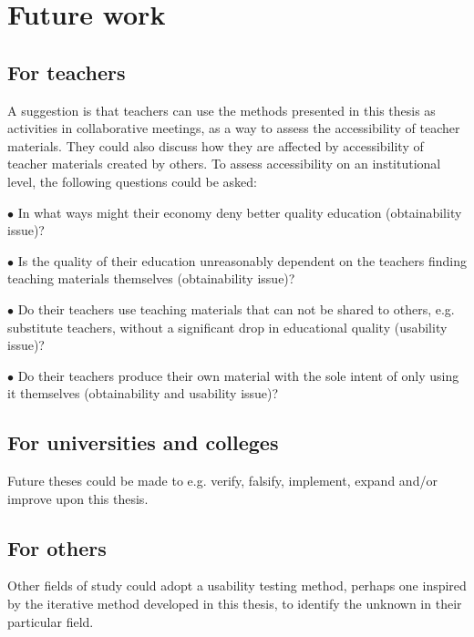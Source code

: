 \section{Future work}	
\subsection{For teachers}
A suggestion is that teachers can use the methods presented in this thesis as activities in collaborative meetings, as a way to assess the accessibility of teacher materials. They could also discuss how they are affected by accessibility of teacher materials created by others. To assess accessibility on an institutional level, the following questions could be asked:
\begin{description}
\item $\bullet$ In what ways might their economy deny better quality education (obtainability issue)? 
\item $\bullet$ Is the quality of their education unreasonably dependent on the teachers finding teaching materials themselves (obtainability issue)? 
\item $\bullet$ Do their teachers use teaching materials that can not be shared to others, e.g. substitute teachers, without a significant drop in educational quality (usability issue)?
\item $\bullet$ Do their teachers produce their own material with the sole intent of only using it themselves (obtainability and usability issue)?
\end{description}
\subsection{For universities and colleges}
Future theses could be made to e.g. verify, falsify, implement, expand and/or improve upon this thesis.
\subsection{For others}
Other fields of study could adopt a usability testing method, perhaps one inspired by the iterative method developed in this thesis, to identify the unknown in their particular field. 
